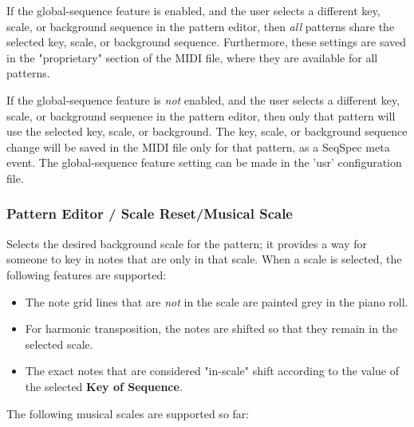    If the global-sequence feature is enabled, and the user selects
   a different key, scale, or background sequence in the pattern editor, 
   then \textsl{all} patterns share the selected key, scale, or background
   sequence.  Furthermore, these settings are saved in the "proprietary"
   section of the MIDI file, where they are available for all patterns.

   If the global-sequence feature is \textsl{not} enabled, and the user selects
   a different key, scale, or background sequence in the pattern editor, 
   then only that pattern will use the selected key, scale, or background.
   The key, scale, or background sequence change will be saved in the MIDI file
   only for that pattern, as a SeqSpec meta event.
   The global-sequence feature setting can be made in the 'usr' configuration
   file.

\subsubsection{Pattern Editor / Scale Reset/Musical Scale}
\label{subsubsec:pattern_editor_second_row_musical_scale}

   Selects the desired background scale for the pattern; it provides a way for
   someone to key in notes that are only in that scale.
   When a scale is selected, the following features are supported:

   \begin{itemize}
      \item The note grid lines that are \textsl{not}
         in the scale are painted grey in the piano roll.
      \item For harmonic transposition, the notes are shifted
         so that they remain in the selected scale.
      \item The exact notes that are considered "in-scale" shift according
         to the value of the selected \textbf{Key of Sequence}.
   \end{itemize}

   The following musical scales are supported so far:

